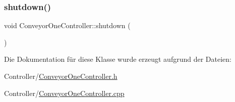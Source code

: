 \subsubsection{\texorpdfstring{shutdown()}{shutdown()}}
{\footnotesize\ttfamily void Conveyor\+One\+Controller\+::shutdown (\begin{DoxyParamCaption}{ }\end{DoxyParamCaption})}



Die Dokumentation für diese Klasse wurde erzeugt aufgrund der Dateien\+:\begin{DoxyCompactItemize}
\item 
Controller/\hyperlink{_conveyor_one_controller_8h}{Conveyor\+One\+Controller.\+h}\item 
Controller/\hyperlink{_conveyor_one_controller_8cpp}{Conveyor\+One\+Controller.\+cpp}\end{DoxyCompactItemize}
